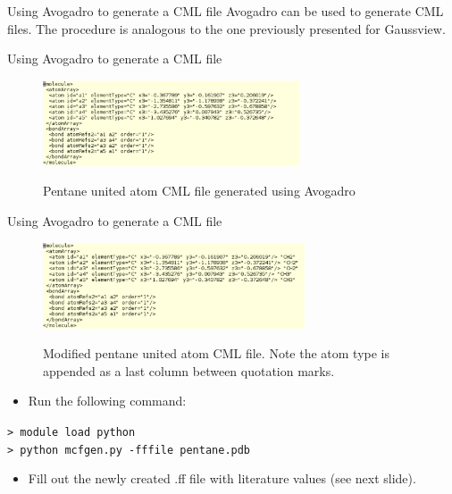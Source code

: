 \documentclass{beamer}
\begin{document}
\begin{frame}{Using Avogadro to generate a CML file}
Avogadro can be used to generate CML files. The procedure is analogous to the one previously
presented for Gaussview.
\end{frame}
\begin{frame}{Using Avogadro to generate a CML file}
\begin{figure}
\begin{center}
\includegraphics[height=1in]{pentane_cml.eps}
\end{center}
Pentane united atom CML file generated using Avogadro
\end{figure}
\end{frame}
\begin{frame}{Using Avogadro to generate a CML file}
\begin{figure}
\begin{center}
\includegraphics[height=1in]{pentane_cml_modified.eps}
\end{center}
Modified pentane united atom CML file. Note the atom type is appended as a last column between quotation marks.
\end{figure}
\end{frame}
\begin{frame}
\begin{itemize}
\item Run the following command:
\end{itemize}
\texttt{> module load python} \\
\texttt{> python mcfgen.py -fffile pentane.pdb}
\begin{itemize}
\item Fill out the newly created .ff file with literature values (see next slide).
\end{itemize}
\end{frame}
\end{document}
